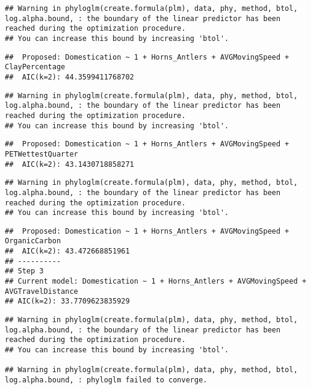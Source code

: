 \documentclass[
]{article}
\begin{document}
\begin{verbatim}
## Warning in phyloglm(create.formula(plm), data, phy, method, btol, log.alpha.bound, : the boundary of the linear predictor has been reached during the optimization procedure.
## You can increase this bound by increasing 'btol'.
\end{verbatim}

\begin{verbatim}
##  Proposed: Domestication ~ 1 + Horns_Antlers + AVGMovingSpeed + ClayPercentage
##  AIC(k=2): 44.3599411768702
\end{verbatim}

\begin{verbatim}
## Warning in phyloglm(create.formula(plm), data, phy, method, btol, log.alpha.bound, : the boundary of the linear predictor has been reached during the optimization procedure.
## You can increase this bound by increasing 'btol'.
\end{verbatim}

\begin{verbatim}
##  Proposed: Domestication ~ 1 + Horns_Antlers + AVGMovingSpeed + PETWettestQuarter
##  AIC(k=2): 43.1430718858271
\end{verbatim}

\begin{verbatim}
## Warning in phyloglm(create.formula(plm), data, phy, method, btol, log.alpha.bound, : the boundary of the linear predictor has been reached during the optimization procedure.
## You can increase this bound by increasing 'btol'.
\end{verbatim}

\begin{verbatim}
##  Proposed: Domestication ~ 1 + Horns_Antlers + AVGMovingSpeed + OrganicCarbon
##  AIC(k=2): 43.472668851961
## ----------
## Step 3
## Current model: Domestication ~ 1 + Horns_Antlers + AVGMovingSpeed + AVGTravelDistance
## AIC(k=2): 33.7709623835929
\end{verbatim}

\begin{verbatim}
## Warning in phyloglm(create.formula(plm), data, phy, method, btol, log.alpha.bound, : the boundary of the linear predictor has been reached during the optimization procedure.
## You can increase this bound by increasing 'btol'.

## Warning in phyloglm(create.formula(plm), data, phy, method, btol, log.alpha.bound, : phyloglm failed to converge.
\end{verbatim}
\end{document}

